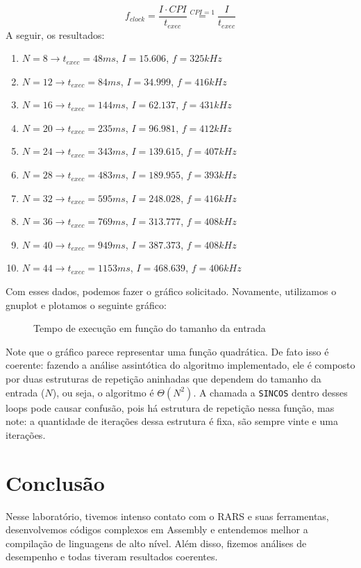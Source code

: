 \documentclass[a4paper,12pt]{article}
\newcommand{\cod}[1]{\texttt{#1}}
\begin{document}
\[
f_{clock} = \frac{I \cdot CPI}{t_{exec}} \overset{CPI=1}{=} \frac{I}{t_{exec}}
\]
A seguir, os resultados:
\begin{enumerate}[label=\alph*), itemsep=0pt]
    \item $N=8 \to t_{exec} = 48ms$, $I = 15.606$, $f = 325kHz$
    \item $N=12 \to t_{exec} = 84ms$, $I = 34.999$, $f = 416kHz$
    \item $N=16 \to t_{exec} = 144ms$, $I = 62.137$, $f = 431kHz$
    \item $N=20 \to t_{exec} = 235ms$, $I = 96.981$, $f = 412kHz$
    \item $N=24 \to t_{exec} = 343ms$, $I = 139.615$, $f = 407kHz$
    \item $N=28 \to t_{exec} = 483ms$, $I = 189.955$, $f = 393kHz$
    \item $N=32 \to t_{exec} = 595ms$, $I = 248.028$, $f = 416kHz$
    \item $N=36 \to t_{exec} = 769ms$, $I = 313.777$, $f = 408kHz$
    \item $N=40 \to t_{exec} = 949ms$, $I = 387.373$, $f = 408kHz$
    \item $N=44 \to t_{exec} = 1153ms$, $I = 468.639$, $f = 406kHz$
\end{enumerate}

Com esses dados, podemos fazer o gráfico solicitado. Novamente, utilizamos o gnuplot e plotamos o seguinte gráfico:

\begin{figure}[H]
    \centering
    
    \vspace{-30pt}
    \caption{Tempo de execução em função do tamanho da entrada}
\end{figure}

Note que o gráfico parece representar uma função quadrática. De fato isso é coerente: fazendo a análise assintótica do algoritmo implementado, ele é composto por duas estruturas de repetição aninhadas que dependem do tamanho da entrada ($N$), ou seja, o algoritmo é $\Theta(N^2)$. A chamada a \cod{SINCOS} dentro desses loops pode causar confusão, pois há estrutura de repetição nessa função, mas note: a quantidade de iterações dessa estrutura é fixa, são sempre vinte e uma iterações.
    
\section{Conclusão}
Nesse laboratório, tivemos intenso contato com o RARS e suas ferramentas, desenvolvemos códigos complexos em Assembly e entendemos melhor a compilação de linguagens de alto nível. Além disso, fizemos análises de desempenho e todas tiveram resultados coerentes.
\end{document}

